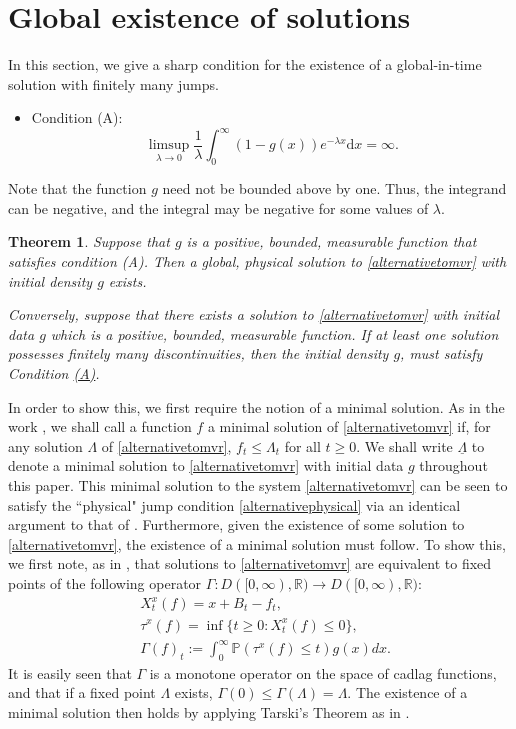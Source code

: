\documentclass[11pt]{article}
\theoremstyle{plain}
\newtheorem{theorem}{Theorem}[section]
\theoremstyle{remark}
\theoremstyle{definition}
\numberwithin{equation}{section}
\begin{document}
\section{Global existence of solutions}
\label{altcond}

In this section, we give a sharp condition for the existence of a global-in-time solution with finitely many jumps.

\begin{itemize}
\item Condition (A): 
    $$\limsup_{\lambda\rightarrow 0}\frac{1}{\lambda}\int_0^\infty (1-g(x))e^{-\lambda x}\textrm{d}x=\infty .$$
\end{itemize}
Note that the function $g$ need not be bounded above by one. Thus, the integrand can be negative, and the integral may be negative for some values of $\lambda$.
\begin{theorem}
\label{conda4}
    Suppose that $g$ is a positive, bounded, measurable function that satisfies condition (A). Then a global, physical solution to \eqref{alternativetomvr} with initial density $g$ exists.

    Conversely, suppose that there exists a solution to \eqref{alternativetomvr} with initial data $g$ which is a positive, bounded, measurable function. If at least one solution
    possesses finitely many discontinuities, then the initial density $g$, must satisfy Condition \hyperlink{A}{(A)}.
\end{theorem}

In order to show this, we first require the notion of a minimal solution. As in the work \cite{minimal}, we shall call a function $f$ a minimal solution of \eqref{alternativetomvr} if, for any solution $\Lambda$ of \eqref{alternativetomvr}, $f_t\leq\Lambda_t$ for all $t\geq 0$. We shall write $\underline{\Lambda}$ to denote a minimal solution to \eqref{alternativetomvr} with initial data $g$ throughout this paper. This minimal solution to the system \eqref{alternativetomvr} can be seen to satisfy the ``physical" jump condition \eqref{alternativephysical} via an identical argument to that of \cite[Theorem 4.7]{ledger2024supercooledstefanproblemtransport}. Furthermore, given the existence of some solution to \eqref{alternativetomvr}, the existence of a minimal solution must follow. To show this, we first note, as in \cite{DIRT1, 2, NS19, minimal}, that solutions to \eqref{alternativetomvr} are equivalent to fixed points of the following operator $\Gamma:D([0,\infty),\mathbb{R})\rightarrow D([0,\infty),\mathbb{R})$:
\begin{align}
    &X_t^{x}(f)=x+B_t-f_t,\nonumber\\
    &\tau^x(f)=\inf\{t\geq 0:X_t^{x}(f)\leq 0\},\label{gammadefn}\\
    &\Gamma(f)_t:=\int_0^\infty \mathbb{P}(\tau^x(f)\leq t)g(x)dx.\nonumber
\end{align}
It is easily seen that $\Gamma$ is a monotone operator on the space of cadlag functions, and that if a fixed point $\Lambda$ exists, $\Gamma(0)\leq \Gamma(\Lambda)=\Lambda$. The existence of a minimal solution then holds by applying Tarski's Theorem as in  \cite[Theorem 4.1]{ledger2024supercooledstefanproblemtransport}. 
\end{document}
